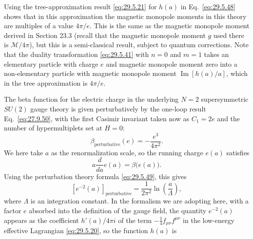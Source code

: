 Using the tree-approximation result \eqref{eq:29.5.21} for \(h(a)\) in
Eq.~\eqref{eq:29.5.48} shows that in this approximation the magnetic
monopole moments in this theory are multiples of a value \(4\pi/e\). This is
the same as the magnetic monopole moment derived in Section 23.3 (recall that
the magnetic monopole moment \(g\) used there is \(\mathcal{M}/4\pi\)), but
this is a semi-classical result, subject to quantum corrections. Note that
the duality transformation \eqref{eq:29.5.41} with \(n=0\) and \(m=1\)
takes an elementary particle with charge \(e\) and magnetic monopole moment
zero into a non-elementary particle with magnetic monopole moment
\(\operatorname{Im}[h(a)/a]\), which in the tree approximation is \(4\pi/e\).

The beta function for the electric charge in the underlying \(N=2\)
supersymmetric \(SU(2)\) gauge theory is given perturbatively by the one-loop
result Eq.~\eqref{eq:27.9.50}, with the first Casimir invariant taken now as
\(C_1=2e\) and the number of hypermultiplets set at \(H=0\):
\begin{equation}
  \beta_{\mathrm{perturbative}}(e)=-\frac{e^3}{4\pi^2}.
  \tag{29.5.49}\label{eq:29.5.49}
\end{equation}
We here take \(a\) as the renormalization scale, so the running charge
\(e(a)\) satisfies
\begin{equation}
  a\frac{d}{da}e(a)=\beta\bigl(e(a)\bigr).
  \tag{29.5.50}\label{eq:29.5.50}
\end{equation}
Using the perturbation theory formula \eqref{eq:29.5.49}, this gives
\begin{equation}
  \left[e^{-2}(a)\right]_{\mathrm{perturbative}}
  =\frac{1}{2\pi^2}\ln\left(\frac{a}{\Lambda}\right),
  \tag{29.5.51}\label{eq:29.5.51}
\end{equation}
where \(\Lambda\) is an integration constant. In the formalism we are
adopting here, with a factor \(e\) absorbed into the definition of the gauge
field, the quantity \(e^{-2}(a)\) appears as the coefficient \(h'(a)/4\pi i\)
of the term \(-\tfrac14f_{\mu\nu}f^{\mu\nu}\) in the low-energy effective
Lagrangian \eqref{eq:29.5.20}, so the function \(h(a)\) is
